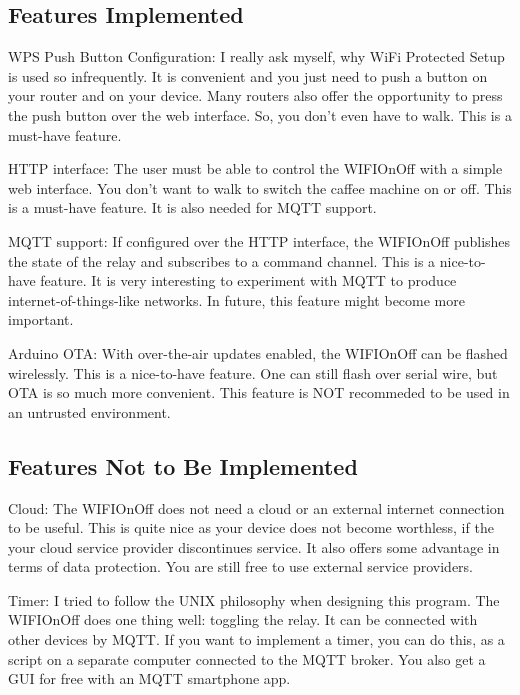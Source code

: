 \subsection*{Features Implemented}


\begin{DoxyItemize}
\item W\-P\-S Push Button Configuration\-: I really ask myself, why Wi\-Fi Protected Setup is used so infrequently. It is convenient and you just need to push a button on your router and on your device. Many routers also offer the opportunity to press the push button over the web interface. So, you don't even have to walk. This is a must-\/have feature.
\item H\-T\-T\-P interface\-: The user must be able to control the W\-I\-F\-I\-On\-Off with a simple web interface. You don't want to walk to switch the caffee machine on or off. This is a must-\/have feature. It is also needed for M\-Q\-T\-T support.
\item M\-Q\-T\-T support\-: If configured over the H\-T\-T\-P interface, the W\-I\-F\-I\-On\-Off publishes the state of the relay and subscribes to a command channel. This is a nice-\/to-\/have feature. It is very interesting to experiment with M\-Q\-T\-T to produce internet-\/of-\/things-\/like networks. In future, this feature might become more important.
\item Arduino O\-T\-A\-: With over-\/the-\/air updates enabled, the W\-I\-F\-I\-On\-Off can be flashed wirelessly. This is a nice-\/to-\/have feature. One can still flash over serial wire, but O\-T\-A is so much more convenient. This feature is N\-O\-T recommeded to be used in an untrusted environment.
\end{DoxyItemize}

\subsection*{Features Not to Be Implemented}


\begin{DoxyItemize}
\item Cloud\-: The W\-I\-F\-I\-On\-Off does not need a cloud or an external internet connection to be useful. This is quite nice as your device does not become worthless, if the your cloud service provider discontinues service. It also offers some advantage in terms of data protection. You are still free to use external service providers.
\item Timer\-: I tried to follow the U\-N\-I\-X philosophy when designing this program. The W\-I\-F\-I\-On\-Off does one thing well\-: toggling the relay. It can be connected with other devices by M\-Q\-T\-T. If you want to implement a timer, you can do this, as a script on a separate computer connected to the M\-Q\-T\-T broker. You also get a G\-U\-I for free with an M\-Q\-T\-T smartphone app.
\end{DoxyItemize}

